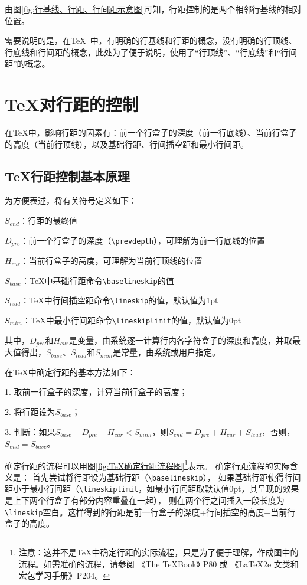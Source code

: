 \documentclass{ctexart}
\newcommand{\cmd}[1]{\texttt{\textbackslash #1}}
\begin{document}
	
	由图\ref{fig:行基线、行距、行间距示意图}可知，行距控制的是两个相邻行基线的相对位置。
	
	需要说明的是，在\TeX\ 中，有明确的行基线和行距的概念，没有明确的行顶线、行底线和行间距的概念，此处为了便于说明，使用了“行顶线”、“行底线”和“行间距”的概念。
	
	\section{\TeX 对行距的控制}
	
	在\TeX 中，影响行距的因素有：前一个行盒子的深度（前一行底线）、当前行盒子的高度（当前行顶线），以及基础行距、行间插空距和最小行间距。
	
	\subsection{\TeX 行距控制基本原理}\label{subsec:TeX行距控制基本原理}
	
	为方便表述，将有关符号定义如下：
	
	$S_{end}$：行距的最终值
	
	$D_{pre}$：前一个行盒子的深度（\cmd{prevdepth}），可理解为前一行底线的位置
	
	$H_{cur}$：当前行盒子的高度，可理解为当前行顶线的位置
	
	
	$S_{base}$：\TeX 中基础行距命令\cmd{baselineskip}的值
	
	$S_{lead}$：\TeX 中行间插空距命令\cmd{lineskip}的值，默认值为1pt
	
	$S_{mim}$：\TeX 中最小行间距命令\cmd{lineskiplimit}的值，默认值为0pt
	
	其中，$D_{pre}$和$H_{cur}$是变量，由系统逐一计算行内各字符盒子的深度和高度，并取最大值得出，$S_{base}$、$S_{lead}$和$S_{mim}$是常量，由系统或用户指定。
	
	在\TeX 中确定行距的基本方法如下：
	
	1. 取前一行盒子的深度，计算当前行盒子的高度；
	
	2. 将行距设为$S_{base}$；
	
	3. 判断：如果$S_{base} - D_{pre} - H_{cur} < S_{mim}$，则$S_{end} = D_{pre} + H_{cur} + S_{lead} $，否则，$S_{end} = S_{base}$。
	
	\enlargethispage{2\baselineskip}
	
	确定行距的流程可以用图\ref{fig:TeX确定行距流程图}\footnote{注意：这并不是\TeX 中确定行距的实际流程，只是为了便于理解，作成图中的流程。如需准确的流程，请参阅 《The \TeX Book》 P80 或 《\LaTeX 2e 文类和宏包学习手册》P204。}表示。
	确定行距流程的实际含义是：
	首先尝试将行距设为基础行距（\cmd{baselineskip}），
	如果基础行距使得行间距小于最小行间距（\cmd{lineskiplimit}，如最小行间距取默认值0pt，其呈现的效果是上下两个行盒子有部分内容重叠在一起），
	则在两个行之间插入一段长度为\cmd{lineskip}空白。这样得到的行距是前一行盒子的深度+行间插空的高度+当前行盒子的高度。
	
\end{document}
